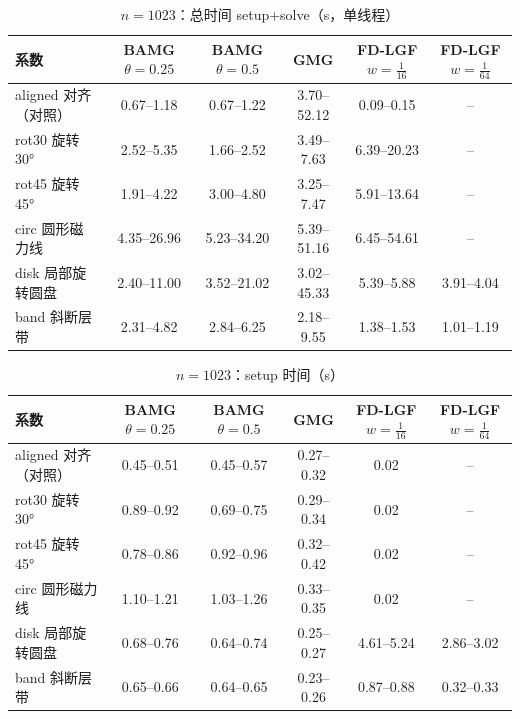 \begin{table}[H]\centering\small
\caption{$n=1023$：总时间 setup+solve（s，单线程）}\label{tab:time}
\begin{tabular}{lccccc}
\toprule
系数 & BAMG $\theta{=}0.25$ & BAMG $\theta{=}0.5$ & GMG & FD-LGF $w{=}\frac1{16}$ & FD-LGF $w{=}\frac1{64}$ \\
\midrule
aligned 对齐（对照） & 0.67--1.18 & 0.67--1.22 & 3.70--52.12 & 0.09--0.15 & -- \\
rot30 旋转 30° & 2.52--5.35 & 1.66--2.52 & 3.49--7.63 & 6.39--20.23 & -- \\
rot45 旋转 45° & 1.91--4.22 & 3.00--4.80 & 3.25--7.47 & 5.91--13.64 & -- \\
circ 圆形磁力线 & 4.35--26.96 & 5.23--34.20 & 5.39--51.16 & 6.45--54.61 & -- \\
disk 局部旋转圆盘 & 2.40--11.00 & 3.52--21.02 & 3.02--45.33 & 5.39--5.88 & 3.91--4.04 \\
band 斜断层带 & 2.31--4.82 & 2.84--6.25 & 2.18--9.55 & 1.38--1.53 & 1.01--1.19 \\
\bottomrule
\end{tabular}
\end{table}

\begin{table}[H]\centering\small
\caption{$n=1023$：setup 时间（s）}\label{tab:setup}
\begin{tabular}{lccccc}
\toprule
系数 & BAMG $\theta{=}0.25$ & BAMG $\theta{=}0.5$ & GMG & FD-LGF $w{=}\frac1{16}$ & FD-LGF $w{=}\frac1{64}$ \\
\midrule
aligned 对齐（对照） & 0.45--0.51 & 0.45--0.57 & 0.27--0.32 & 0.02 & -- \\
rot30 旋转 30° & 0.89--0.92 & 0.69--0.75 & 0.29--0.34 & 0.02 & -- \\
rot45 旋转 45° & 0.78--0.86 & 0.92--0.96 & 0.32--0.42 & 0.02 & -- \\
circ 圆形磁力线 & 1.10--1.21 & 1.03--1.26 & 0.33--0.35 & 0.02 & -- \\
disk 局部旋转圆盘 & 0.68--0.76 & 0.64--0.74 & 0.25--0.27 & 4.61--5.24 & 2.86--3.02 \\
band 斜断层带 & 0.65--0.66 & 0.64--0.65 & 0.23--0.26 & 0.87--0.88 & 0.32--0.33 \\
\bottomrule
\end{tabular}
\end{table}

